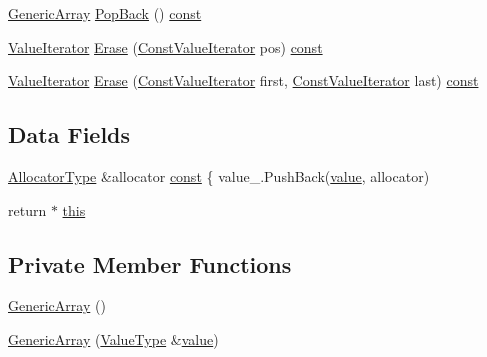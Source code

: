 \begin{DoxyCompactItemize}
\item 
\mbox{\hyperlink{classrapidjson_1_1_generic_array}{Generic\+Array}} \mbox{\hyperlink{classrapidjson_1_1_generic_array_a50ccee2eea89c21fcd29363506e5ed3f}{Pop\+Back}} () \mbox{\hyperlink{classrapidjson_1_1_generic_array_a363f892bf386776e236f5db273f2599f}{const}}
\item 
\mbox{\hyperlink{classrapidjson_1_1_generic_array_ae94140e6dbab05cd3918d3e75819dc0a}{Value\+Iterator}} \mbox{\hyperlink{classrapidjson_1_1_generic_array_a13d2a18801a80add6e1bd9ad167822a5}{Erase}} (\mbox{\hyperlink{classrapidjson_1_1_generic_array_a0308428814ba3ee5094114e2ccfa2572}{Const\+Value\+Iterator}} pos) \mbox{\hyperlink{classrapidjson_1_1_generic_array_a363f892bf386776e236f5db273f2599f}{const}}
\item 
\mbox{\hyperlink{classrapidjson_1_1_generic_array_ae94140e6dbab05cd3918d3e75819dc0a}{Value\+Iterator}} \mbox{\hyperlink{classrapidjson_1_1_generic_array_af8fb2a13a98c62a284de0005850d624c}{Erase}} (\mbox{\hyperlink{classrapidjson_1_1_generic_array_a0308428814ba3ee5094114e2ccfa2572}{Const\+Value\+Iterator}} first, \mbox{\hyperlink{classrapidjson_1_1_generic_array_a0308428814ba3ee5094114e2ccfa2572}{Const\+Value\+Iterator}} last) \mbox{\hyperlink{classrapidjson_1_1_generic_array_a363f892bf386776e236f5db273f2599f}{const}}
\end{DoxyCompactItemize}
\subsection*{Data Fields}
\begin{DoxyCompactItemize}
\item 
\mbox{\hyperlink{classrapidjson_1_1_generic_array_a82298d507b2b15c9d909c25a32f5afeb}{Allocator\+Type}} \&allocator \mbox{\hyperlink{classrapidjson_1_1_generic_array_a363f892bf386776e236f5db273f2599f}{const}} \{ value\+\_\+.\+Push\+Back(\mbox{\hyperlink{namespacerapidjson_a1a75d60792094d496b500c40776030dd}{value}}, allocator)
\item 
return $\ast$ \mbox{\hyperlink{classrapidjson_1_1_generic_array_a21bef2fc4704ddcdced3966fd85904d2}{this}}
\end{DoxyCompactItemize}
\subsection*{Private Member Functions}
\begin{DoxyCompactItemize}
\item 
\mbox{\hyperlink{classrapidjson_1_1_generic_array_a2c2f6824d1243d316baeaffd2ff878f7}{Generic\+Array}} ()
\item 
\mbox{\hyperlink{classrapidjson_1_1_generic_array_ab02177c7ee12063e26a6a99bc343df46}{Generic\+Array}} (\mbox{\hyperlink{classrapidjson_1_1_generic_array_aebd828a2f020262b41af908fbb28a571}{Value\+Type}} \&\mbox{\hyperlink{namespacerapidjson_a1a75d60792094d496b500c40776030dd}{value}})
\end{DoxyCompactItemize}
